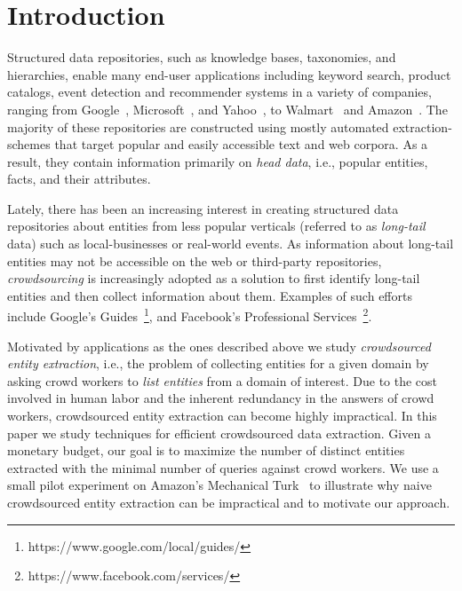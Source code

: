 
\section{Introduction}
\label{sec:intro}
Structured data repositories, such as knowledge bases, taxonomies, and hierarchies, enable many end-user applications including keyword search, product catalogs, event detection and recommender systems in a variety of companies, ranging from Google~\cite{singhal2012introducing}, Microsoft~\cite{cheng2010fuzzy}, and Yahoo~\cite{woo}, to 
Walmart~\cite{Deshpande:2013:BMU:2463676.2465297} and Amazon~\cite{amazon-product}. The majority of these repositories are constructed using mostly automated extraction-schemes that target popular and easily accessible text and web corpora. As a result, they contain information primarily on {\em head data}, i.e., popular entities, facts, and their attributes. 

Lately, there has been an increasing interest in creating structured data repositories about entities from less popular verticals (referred to as {\em long-tail} data) such as local-businesses or real-world events. As information about long-tail entities may not be accessible on the web or third-party repositories, {\em crowdsourcing} is increasingly adopted as a solution to first identify long-tail entities and then collect information about them. Examples of such efforts include Google's Guides~\footnote{https://www.google.com/local/guides/}, and Facebook's Professional Services~\footnote{https://www.facebook.com/services/}. 

Motivated by applications as the ones described above we study {\em crowdsourced entity extraction}, i.e., the problem of collecting entities for a given domain by asking crowd workers to {\em list entities} from a domain of interest. Due to the cost involved in human labor and the inherent redundancy in the answers of crowd workers, crowdsourced entity extraction can become highly impractical. In this paper we study techniques for efficient crowdsourced data extraction. Given a monetary budget, our goal is to maximize the number of distinct entities extracted with the minimal number of queries against crowd workers. We use a small pilot experiment on Amazon's Mechanical Turk~\cite{mturk} to illustrate why naive crowdsourced entity extraction can be impractical and to motivate our approach. 

